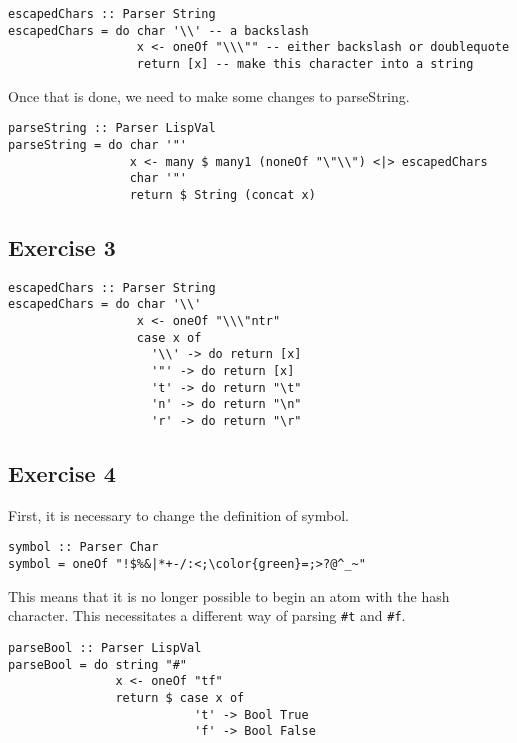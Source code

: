 \begin{lstlisting}
escapedChars :: Parser String
escapedChars = do char '\\' -- a backslash
                  x <- oneOf "\\\"" -- either backslash or doublequote
                  return [x] -- make this character into a string
\end{lstlisting}
 
Once that is done, we need to make some changes to parseString.
 
\begin{lstlisting}
parseString :: Parser LispVal
parseString = do char '"'
                 x <- many $ many1 (noneOf "\"\\") <|> escapedChars
                 char '"'
                 return $ String (concat x)
\end{lstlisting}
 
\subsection{Exercise 3}
 
\begin{lstlisting}
escapedChars :: Parser String
escapedChars = do char '\\' 
                  x <- oneOf "\\\"ntr" 
                  case x of 
                    '\\' -> do return [x]
                    '"' -> do return [x]
                    't' -> do return "\t"
                    'n' -> do return "\n"
                    'r' -> do return "\r"
\end{lstlisting}
 
\subsection{Exercise 4}
 
First, it is necessary to change the definition of symbol.
 
\begin{lstlisting}
symbol :: Parser Char
symbol = oneOf "!$%&|*+-/:<;\color{green}=;>?@^_~"
\end{lstlisting}
 
This means that it is no longer possible to begin an atom with the hash character. This necessitates a different way of parsing \verb|#t| and \verb|#f|.
 
\begin{lstlisting}
parseBool :: Parser LispVal
parseBool = do string "#"
               x <- oneOf "tf"
               return $ case x of 
                          't' -> Bool True
                          'f' -> Bool False
\end{lstlisting}
 
